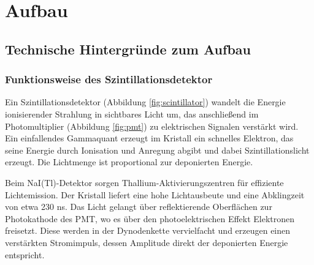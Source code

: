 \chapter{Aufbau}

\section{Technische Hintergründe zum Aufbau}
\subsection{Funktionsweise des Szintillationsdetektor}
Ein Szintillationsdetektor (Abbildung \ref{fig:scintillator}) wandelt die Energie ionisierender Strahlung in sichtbares Licht um, das anschließend im Photomultiplier (Abbildung \ref{fig:pmt}) zu elektrischen Signalen verstärkt wird. Ein einfallendes Gammaquant erzeugt im Kristall ein schnelles Elektron, das seine Energie durch Ionisation und Anregung abgibt und dabei Szintillationslicht erzeugt. Die Lichtmenge ist proportional zur deponierten Energie.

Beim NaI(Tl)-Detektor sorgen Thallium-Aktivierungszentren für effiziente Lichtemission. Der Kristall liefert eine hohe Lichtausbeute und eine Abklingzeit von etwa 230 ns. Das Licht gelangt über reflektierende Oberflächen zur Photokathode des PMT, wo es über den photoelektrischen Effekt Elektronen freisetzt. Diese werden in der Dynodenkette vervielfacht und erzeugen einen verstärkten Stromimpuls, dessen Amplitude direkt der deponierten Energie entspricht.


